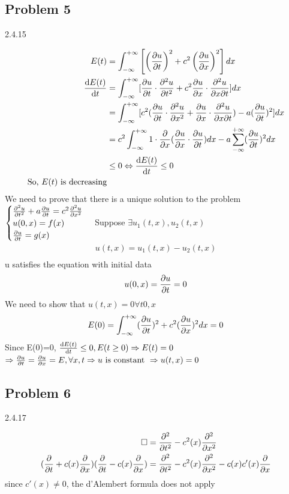 \subsection*{Problem 5}
2.4.15
\begin{solution}
    \begin{align*}{}{}
    E(t)&=\int_{-\infty}^{+\infty} \left[ \left( \frac{\partial u}{\partial t} \right)^2 + c^2 \left( \frac{\partial u}{\partial x} \right)^2 \right]dx\\
    \dv{E(t)}{t}&=\int_{-\infty}^{+\infty}[\pdv{u}{t}\cdot \pdv[2]{u}{t}+c^2\pdv{u}{x}\cdot \pdv{u}{x}{t}]dx\\
    &=\int_{-\infty}^{+\infty}[c^2(\pdv{u}{t}\cdot \pdv[2]{u}{x}+\pdv{u}{x}\cdot \pdv{u}{x}{t})-a(\pdv{u}{t})^2]dx\\
    &=c^2\int_{-\infty}^{+\infty}1\cdot \frac{\partial}{\partial x}(\pdv{u}{x}\cdot \pdv{u}{t})dx- a\sum_{-\infty}^{+\infty}(\pdv{u}{t})^2dx\\
    &\leq 0 \Leftrightarrow \dv{E(t)}{t}\leq 0\\
    \text{So, } E(t) \text{ is decreasing}
    \end{align*}
    We need to prove that there is a unique solution to the problem$\begin{cases}
    \pdv[2]{u}{t}+a\pdv{u}{t}=c^2\pdv[2]{u}{x}\\
    u(0,x)=f(x)\\
    \pdv{u}{t}(0,x)=g(x)
    \end{cases}$
    Suppose $ \exists u_1(t,x),u_2(t,x)$\begin{align*}{}{}
    u(t,x)=u_1(t,x)-u_2(t,x)\\
    \end{align*}  
    u satisfies the equation with initial data$$
        u(0,x)=\pdv{u}{t}(0,x)=0
    $$ 
    We need to show that $ u(t,x)=0  \forall  t 0,x  $$$
        E(0)=\int_{-\infty}^{+\infty}(\pdv{u}{t}(0,x))^2+c^2(\pdv{u}{x}(0,x))^2dx=0
    $$ 
    Since E(0)=0, $ \dv{E(t)}{t}\leq0 ,E(t\geq0) \Rightarrow E(t)=0$ 
    $ \Rightarrow \pdv{u}{t}(t,x)=\pdv{u}{x}(t,x)=E,\forall x,t \Rightarrow u \text{ is constant } \Rightarrow u(t,x)=0$ 
\end{solution}
\subsection*{Problem 6}
2.4.17
\begin{solution}
    \begin{align*}{}{}
    \square&= \pdv[2]{t}-c^2(x)\pdv[2]{x}\\
    (\pdv{t}+c(x)\pdv{x})(\pdv{t}-c(x)\pdv{x})&=\pdv[2]{t}-c^2(x)\pdv[2]{x}-c(x)c'(x)\pdv{x}\\
    \end{align*}
    since $ c'(x)\neq 0 $, the d'Alembert formula does not apply
\end{solution}
